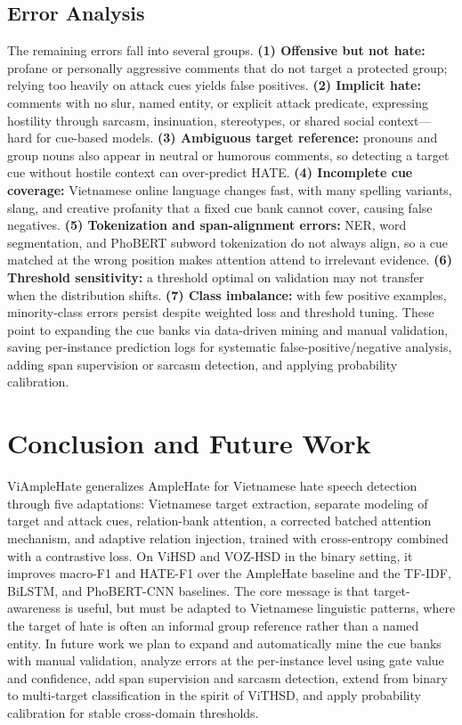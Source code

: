 \documentclass[11pt]{article}
\begin{document}
\subsection{Error Analysis}
The remaining errors fall into several groups. \textbf{(1) Offensive but not hate:} profane or personally aggressive comments that do not target a protected group; relying too heavily on attack cues yields false positives. \textbf{(2) Implicit hate:} comments with no slur, named entity, or explicit attack predicate, expressing hostility through sarcasm, insinuation, stereotypes, or shared social context---hard for cue-based models. \textbf{(3) Ambiguous target reference:} pronouns and group nouns also appear in neutral or humorous comments, so detecting a target cue without hostile context can over-predict HATE. \textbf{(4) Incomplete cue coverage:} Vietnamese online language changes fast, with many spelling variants, slang, and creative profanity that a fixed cue bank cannot cover, causing false negatives. \textbf{(5) Tokenization and span-alignment errors:} NER, word segmentation, and PhoBERT subword tokenization do not always align, so a cue matched at the wrong position makes attention attend to irrelevant evidence. \textbf{(6) Threshold sensitivity:} a threshold optimal on validation may not transfer when the distribution shifts. \textbf{(7) Class imbalance:} with few positive examples, minority-class errors persist despite weighted loss and threshold tuning. These point to expanding the cue banks via data-driven mining and manual validation, saving per-instance prediction logs for systematic false-positive/negative analysis, adding span supervision or sarcasm detection, and applying probability calibration.

\section{Conclusion and Future Work}

ViAmpleHate generalizes AmpleHate for Vietnamese hate speech detection through five adaptations: Vietnamese target extraction, separate modeling of target and attack cues, relation-bank attention, a corrected batched attention mechanism, and adaptive relation injection, trained with cross-entropy combined with a contrastive loss. On ViHSD and VOZ-HSD in the binary setting, it improves macro-F1 and HATE-F1 over the AmpleHate baseline and the TF-IDF, BiLSTM, and PhoBERT-CNN baselines. The core message is that target-awareness is useful, but must be adapted to Vietnamese linguistic patterns, where the target of hate is often an informal group reference rather than a named entity. In future work we plan to expand and automatically mine the cue banks with manual validation, analyze errors at the per-instance level using gate value and confidence, add span supervision and sarcasm detection, extend from binary to multi-target classification in the spirit of ViTHSD, and apply probability calibration for stable cross-domain thresholds.
\end{document}
